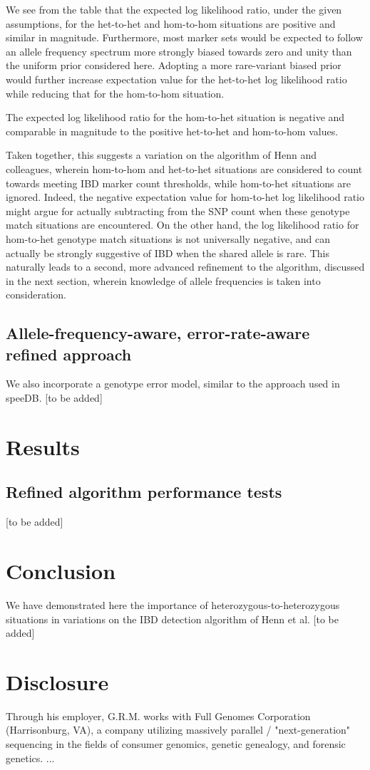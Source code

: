 \documentclass{article}
\begin{document}
We see from the table that the expected log likelihood ratio, under the given assumptions, for the het-to-het and hom-to-hom situations are positive and similar in magnitude. Furthermore, most marker sets would be expected to follow an allele frequency spectrum more strongly biased towards zero and unity than the uniform prior considered here. Adopting a more rare-variant biased prior would further increase expectation value for the het-to-het log likelihood ratio while reducing that for the hom-to-hom situation.

The expected log likelihood ratio for the hom-to-het situation is negative and comparable in magnitude to the positive het-to-het and hom-to-hom values.

Taken together, this suggests a variation on the algorithm of Henn and colleagues, wherein hom-to-hom and het-to-het situations are considered to count towards meeting IBD marker count thresholds, while hom-to-het situations are ignored. Indeed, the negative expectation value for hom-to-het log likelihood ratio might argue for actually subtracting from the SNP count when these genotype match situations are encountered. On the other hand, the log likelihood ratio for hom-to-het genotype match situations is not universally negative, and can actually be strongly suggestive of IBD when the shared allele is rare. This naturally leads to a second, more advanced refinement to the algorithm, discussed in the next section, wherein knowledge of allele frequencies is taken into consideration.

\subsection{Allele-frequency-aware, error-rate-aware refined approach}
We also incorporate a genotype error model, similar to the approach used in speeDB.\citep{speeDB}
[to be added]

\section{Results}
\subsection{Refined algorithm performance tests}
[to be added]

\section{Conclusion}
We have demonstrated here the importance of heterozygous-to-heterozygous situations in variations on the IBD detection algorithm of Henn et al. [to be added] 

\section{Disclosure}
Through his employer, G.R.M. works with Full Genomes Corporation (Harrisonburg, VA), a company utilizing massively parallel / "next-generation" sequencing in the fields of consumer genomics, genetic genealogy, and forensic genetics.
...



\end{document}
